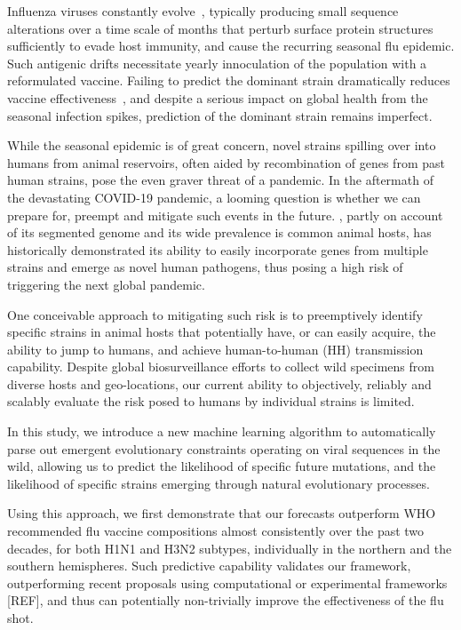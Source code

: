 \documentclass[onecolumn, compsoc,10pt]{IEEEtran}
\begin{document}
\vspace{10pt}

Influenza viruses constantly evolve~\cite{dos2016influenza}, typically producing small sequence alterations over a time scale of months  that  perturb surface protein structures sufficiently to evade host immunity, and cause the  recurring seasonal flu epidemic. Such antigenic drifts necessitate yearly innoculation of the population with a  reformulated  vaccine.  Failing to predict the dominant strain  dramatically reduces  vaccine effectiveness~\cite{tricco2013comparing}, and despite a serious  impact on global health from the seasonal infection spikes, prediction of the dominant strain remains imperfect.


While the seasonal epidemic is of great concern, novel \infl strains spilling over into humans from animal reservoirs, often aided by  recombination of genes from past human  strains, pose the even graver threat of a  pandemic.
In the aftermath of the devastating COVID-19 pandemic, a looming question is whether we can prepare for, preempt and mitigate such events in the future.  \infl,  partly on account of its segmented genome and its wide prevalence is common animal hosts, has historically demonstrated its ability to easily incorporate genes from multiple strains and emerge as novel human pathogens,  thus posing a high risk of triggering the next  global pandemic.

One conceivable approach to mitigating such risk is to preemptively identify specific strains in animal hosts that potentially have, or can easily acquire, the ability to  jump to humans, and achieve human-to-human (HH) transmission capability. Despite global biosurveillance efforts to  collect wild specimens from diverse hosts and geo-locations, our current ability to objectively, reliably and scalably  evaluate the risk posed to  humans by  individual strains  is limited.

In this study, we introduce a new machine learning algorithm to automatically parse out emergent evolutionary constraints operating on viral sequences in the wild, allowing us to predict the likelihood of specific future  mutations, and  the likelihood of specific  strains emerging through natural evolutionary processes.

Using this approach, we first demonstrate that our forecasts outperform WHO recommended flu vaccine compositions almost consistently over the past two decades, for both H1N1 and H3N2 subtypes, individually in the northern and the southern hemispheres. Such predictive capability validates our framework, outperforming recent proposals using computational or experimental frameworks [REF], and thus can potentially non-trivially improve the effectiveness of the flu shot.
\end{document}
